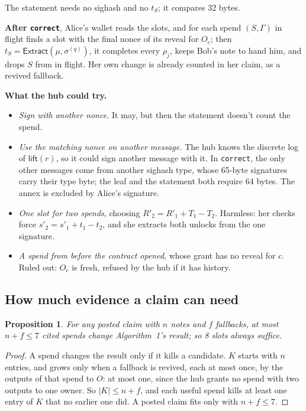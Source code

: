 \documentclass[11pt]{article}
\theoremstyle{plain}
\newtheorem{proposition}{Proposition}
\theoremstyle{definition}
\newcommand{\tx}[1]{\texttt{#1}}
\newcommand{\Extr}{\mathsf{Extract}}
\newcommand{\Oc}{O_c}
\begin{document}
The statement needs no sighash and no $t_S$; it compares 32 bytes.

\textbf{After \tx{correct}}, Alice's wallet reads the slots, and for each
spend $(S, \Gamma)$ in flight finds a slot with the final nonce of its
reveal for $\Oc$; then $t_S = \Extr(\mu, \sigma^{(q)})$, it completes
every $\rho_j$, keeps Bob's note to hand him, and drops $S$ from in
flight. Her own change is already counted in her claim, as a revived
fallback.

\textbf{What the hub could try.}
\begin{itemize}[nosep]
\item \emph{Sign with another nonce.} It may, but then the statement
  doesn't count the spend.
\item \emph{Use the matching nonce on another message.} The hub knows
  the discrete log of $\mathsf{lift}(r)$, so it could sign another
  message with it. In \tx{correct}, the only other messages come from
  another sighash type, whose 65-byte signatures carry their type
  byte; the leaf and the statement both require 64 bytes. The annex is
  excluded by Alice's signature.
\item \emph{One slot for two spends}, choosing $R'_2 = R'_1 + T_1 -
  T_2$. Harmless: her checks force $s'_2 = s'_1 + t_1 - t_2$, and she
  extracts both unlocks from the one signature.
\item \emph{A spend from before the contract opened}, whose grant has no
  reveal for $c$. Ruled out: $\Oc$ is fresh, refused by the hub if it
  has history.
\end{itemize}

\subsection{How much evidence a claim can need}\label{sec:volume}

\begin{proposition}\label{prop:volume}
For any posted claim with $n$ notes and $f$ fallbacks, at most $n + f
\le 7$ cited spends change Algorithm~1's result; so 8 slots
always suffice.
\end{proposition}
\begin{proof}
A spend changes the result only if it kills a candidate. $K$ starts
with $n$ entries, and grows only when a fallback is revived, each at
most once, by the outputs of that spend to $O$: at most one, since the
hub grants no spend with two outputs to one owner. So $|K| \le n + f$,
and each useful spend kills at least one entry of $K$ that no earlier
one did. A posted claim fits only with $n + f \le 7$.
\end{proof}
\end{document}
